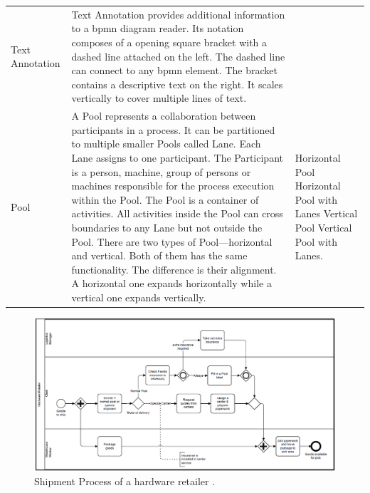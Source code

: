 \begin{longtable}{C{0.2\textwidth} L{0.45\textwidth} C{0.3\textwidth}}
	Text Annotation &
	Text Annotation provides additional information to a \gls{bpmn} diagram reader.
	Its notation composes of a opening square bracket with a dashed line attached on the left.
	The dashed line can connect to any \gls{bpmn} element.
	The bracket contains a descriptive text on the right.
	It scales vertically to cover multiple lines of text.
	&
	 \\
	
	Pool &
	A Pool represents a collaboration between participants in a process.
	It can be partitioned to multiple smaller Pools called Lane.
	Each Lane assigns to one participant.
	The Participant is a person, machine, group of persons or machines responsible for the process execution within the Pool.
	The Pool is a container of activities.
	All activities inside the Pool can cross boundaries to any Lane but not outside the Pool.
	There are two types of Pool---horizontal and vertical.
	Both of them has the same functionality.
	The difference is their alignment.
	A horizontal one expands horizontally while a vertical one expands vertically.
	
	&
	Horizontal Pool
	Horizontal Pool with Lanes
	Vertical Pool
	Vertical Pool with Lanes. \\
	
	\hline

\end{longtable}

\newpage

\begin{figure}[t]
	\centering
	\includegraphics[scale=0.55]{res/bg-knowledge/bpmn-example}
	\caption{Shipment Process of a hardware retailer  \cite{bpmn_manual_example_omg}.}
	\label{fig:bpmn-example}
\end{figure}

